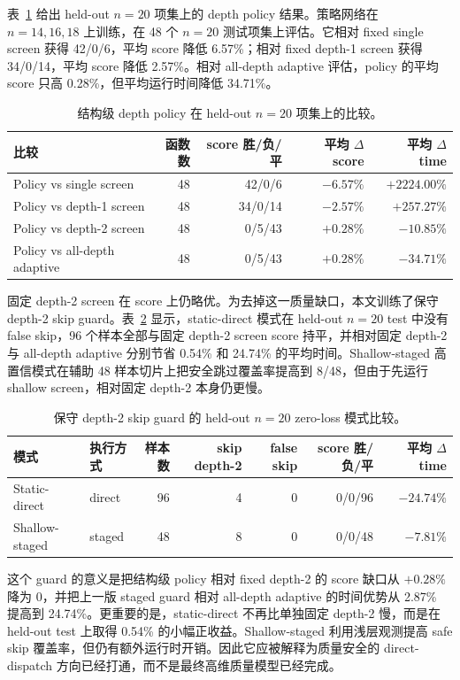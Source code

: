 \documentclass[UTF8,fontset=macnew,11pt]{ctexart}
\begin{document}
表~\ref{tab:policy} 给出 held-out $n=20$ 项集上的 depth policy 结果。策略网络在 $n=14,16,18$ 上训练，在 48 个 $n=20$ 测试项集上评估。它相对 fixed single screen 获得 42/0/6，平均 score 降低 6.57\%；相对 fixed depth-1 screen 获得 34/0/14，平均 score 降低 2.57\%。相对 all-depth adaptive 评估，policy 的平均 score 只高 0.28\%，但平均运行时间降低 34.71\%。

\begin{table}[t]
\centering
\small
\caption{结构级 depth policy 在 held-out $n=20$ 项集上的比较。}
\label{tab:policy}
\begin{tabular}{lrrrr}
\toprule
比较 & 函数数 & score 胜/负/平 & 平均 $\Delta$ score & 平均 $\Delta$ time \\
\midrule
Policy vs single screen & 48 & 42/0/6 & $-6.57\%$ & $+2224.00\%$ \\
Policy vs depth-1 screen & 48 & 34/0/14 & $-2.57\%$ & $+257.27\%$ \\
Policy vs depth-2 screen & 48 & 0/5/43 & $+0.28\%$ & $-10.85\%$ \\
Policy vs all-depth adaptive & 48 & 0/5/43 & $+0.28\%$ & $-34.71\%$ \\
\bottomrule
\end{tabular}
\end{table}

固定 depth-2 screen 在 score 上仍略优。为去掉这一质量缺口，本文训练了保守 depth-2 skip guard。表~\ref{tab:guard} 显示，static-direct 模式在 held-out $n=20$ test 中没有 false skip，96 个样本全部与固定 depth-2 screen score 持平，并相对固定 depth-2 与 all-depth adaptive 分别节省 0.54\% 和 24.74\% 的平均时间。Shallow-staged 高置信模式在辅助 48 样本切片上把安全跳过覆盖率提高到 8/48，但由于先运行 shallow screen，相对固定 depth-2 本身仍更慢。

\begin{table}[t]
\centering
\small
\caption{保守 depth-2 skip guard 的 held-out $n=20$ zero-loss 模式比较。}
\label{tab:guard}
\begin{tabular}{llrrrrr}
\toprule
模式 & 执行方式 & 样本数 & skip depth-2 & false skip & score 胜/负/平 & 平均 $\Delta$ time \\
\midrule
Static-direct & direct & 96 & 4 & 0 & 0/0/96 & $-24.74\%$ \\
Shallow-staged & staged & 48 & 8 & 0 & 0/0/48 & $-7.81\%$ \\
\bottomrule
\end{tabular}
\end{table}

这个 guard 的意义是把结构级 policy 相对 fixed depth-2 的 score 缺口从 $+0.28\%$ 降为 $0$，并把上一版 staged guard 相对 all-depth adaptive 的时间优势从 2.87\% 提高到 24.74\%。更重要的是，static-direct 不再比单独固定 depth-2 慢，而是在 held-out test 上取得 0.54\% 的小幅正收益。Shallow-staged 利用浅层观测提高 safe skip 覆盖率，但仍有额外运行时开销。因此它应被解释为质量安全的 direct-dispatch 方向已经打通，而不是最终高维质量模型已经完成。
\end{document}
